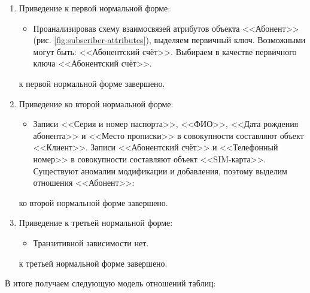 \begin{enumerate}
    \item Приведение к первой нормальной форме:
    \begin{itemize}
        \item Проанализировав схему взаимосвязей атрибутов объекта <<Абонент>> (рис. \ref{fig:subscriber-attributes}), выделяем первичный ключ. Возможными могут быть: <<Абонентский счёт>>. Выбираем в качестве первичного ключа <<Абонентский счёт>>.
    \end{itemize}
    \tab{} к первой нормальной форме завершено.

    \item Приведение ко второй нормальной форме:
    \begin{itemize}
        \item Записи <<Серия и номер паспорта>>, <<ФИО>>, <<Дата рождения абонента>> и <<Место прописки>> в совокупности составляют объект <<Клиент>>. Записи <<Абонентский счёт>> и <<Телефонный номер>> в совокупности составляют объект <<SIM-карта>>. Существуют аномалии модификации и добавления, поэтому выделим отношения <<Абонент>>:
    \end{itemize}
    \tab{} ко второй нормальной форме завершено.

    \item Приведение к третьей нормальной форме:
    \begin{itemize}
        \item Транзитивной зависимости нет.
    \end{itemize}
    \tab{} к третьей нормальной форме завершено.
\end{enumerate}


В итоге получаем следующую модель отношений таблиц:
